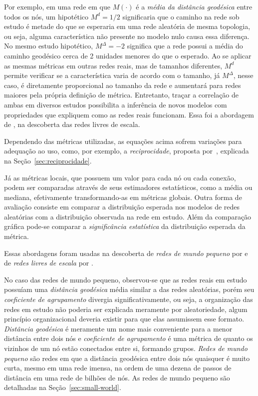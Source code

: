 \documentclass[12pt,a4paper]{article}
\theoremstyle{hypo}
\begin{document}
Por exemplo, em uma rede em que $M(\cdot)$ é a \textit{média da distância geodésica} entre todos os nós, um hipotético $M^d = 1/2$ significaria que o caminho na rede sob estudo é metade do que se esperaria em uma rede aleatória de mesma topologia, ou seja, alguma característica não presente no modelo nulo causa essa diferença. No mesmo estudo hipotético, $M^\Delta = -2$ significa que a rede possui a média do caminho geodésico cerca de 2 unidades menores do que o esperado. Ao se aplicar as mesmas métricas em outras redes reais, mas de tamanhos diferentes, $M^d$ permite verificar se a característica varia de acordo com o tamanho, já $M^\Delta$, nesse caso, é diretamente proporcional ao tamanho da rede e aumentará para redes maiores pela própria definição de métrica. Entretanto, traçar a correlação de ambas em diversos estudos possibilita a inferência de novos modelos com propriedades que expliquem como as redes reais funcionam. Essa foi a abordagem de \cite{Barabasi1999-sn}, na descoberta das redes livres de escala. 

Dependendo das métricas utilizadas, as equações acima sofrem variações para adequação ao uso, como, por exemplo, a \textit{reciprocidade}, proposta por~, explicada na Seção~\ref{sec:reciprocidade}.

Já as métricas locais, que possuem um valor para cada nó ou cada conexão, podem ser comparadas através de seus estimadores estatísticos, como a média ou mediana, efetivamente transformando-as em métricas globais. Outra forma de avaliação consiste em comparar a distribuição esperada nos modelos de redes aleatórias com a distribuição observada na rede em estudo. Além da comparação gráfica pode-se comparar a \textit{significância estatística} da distribuição esperada da métrica.


Essas abordagens foram usadas na descoberta de \textit{redes de mundo pequeno} por  e de \textit{redes livres de escala} por .

No caso das redes de mundo pequeno, observou-se que as redes reais em estudo possuíam uma \textit{distância geodésica} média similar a das redes aleatórias, porém seu \textit{coeficiente de agrupamento} divergia significativamente, ou seja, a organização das redes em estudo não poderia ser explicada meramente por aleatoriedade, algum princípio organizacional deveria existir para que elas assumissem esse formato. \textit{Distância geodésica} é meramente um nome mais conveniente para a menor distância entre dois nós e \textit{coeficiente de agrupamento} é uma métrica de quanto os vizinhos de um nó estão conectados entre si, formando grupos. \textit{Redes de mundo pequeno} são redes em que a distância geodésica entre dois nós quaisquer é muito curta, mesmo em uma rede imensa, na ordem de uma dezena de passos de distância em uma rede de bilhões de nós. As redes de mundo pequeno são detalhadas na Seção~\ref{sec:small-world}. 
\end{document}
